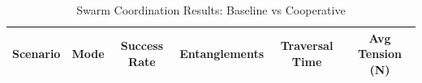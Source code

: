 
\begin{table}[ht]
\centering
\caption{Swarm Coordination Results: Baseline vs Cooperative}
\label{table:swarm_results}
\begin{tabular}{lccccc}
\toprule
Scenario & Mode & Success Rate & Entanglements & Traversal Time & Avg Tension (N) \\
\midrule
\bottomrule
\end{tabular}
\end{table}
